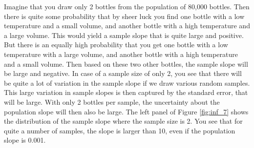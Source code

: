 \documentclass[]{report}\usepackage[]{graphicx}\usepackage[]{color}
\begin{document}


Imagine that you draw only 2 bottles from the population of 80,000 bottles. Then there is quite some probability that by sheer luck you find one bottle with a low temperature and a small volume, and another bottle with a high temperature and a large volume. This would yield a sample slope that is quite large and positive. But there is an equally high probability that you get one bottle with a low temperature with a large volume, and another bottle with a high temperature and a small volume. Then based on these two other bottles, the sample slope will be large and negative. In case of a sample size of only 2, you see that there will be quite a lot of variation in the sample slope if we draw various random samples. This large variation in sample slopes is then captured by the standard error, that will be large. With only 2 bottles per sample, the uncertainty about the population slope will then also be large. The left panel of Figure \ref{fig:inf_7} shows the distribution of the sample slope where the sample size is 2. You see that for quite a number of samples, the slope is larger than 10, even if the population slope is 0.001.
\end{document}
